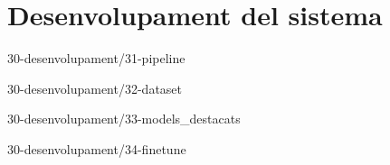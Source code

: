 \chapter{Desenvolupament del sistema}

{30-desenvolupament/31-pipeline}

{30-desenvolupament/32-dataset}

{30-desenvolupament/33-models_destacats}

{30-desenvolupament/34-finetune}






\begin{comment}
3 Desenvolupament del sistema
    3.1 Arquitectura del sistema (pipeline)
    3.2 Creació dataset sintètic
    [?] 3.3 Creació de tests
    3.4 Fine-tune sintètic
    3.5 Dataset i fine-tune amb dades reals
        3.5.1 Estadístiques descriptives
        3.5.2 Tendències i patrons
        3.5.3 Problemes i incidències comunes
        3.5.4 Anomalies i valors atípics
    3.6 Desplegament API
\end{comment}
